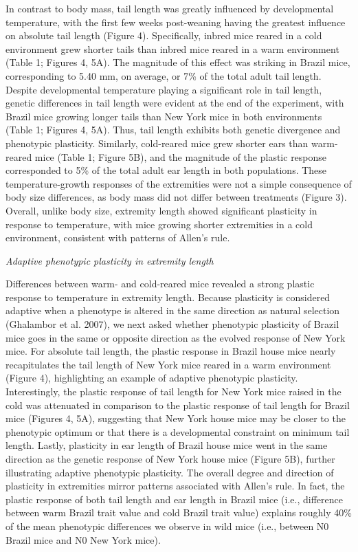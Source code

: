 \documentclass[
]{article}
\begin{document}
In contrast to body mass, tail length was greatly influenced by
developmental temperature, with the first few weeks post-weaning having
the greatest influence on absolute tail length (Figure 4). Specifically,
inbred mice reared in a cold environment grew shorter tails than inbred
mice reared in a warm environment (Table 1; Figures 4, 5A). The
magnitude of this effect was striking in Brazil mice, corresponding to
5.40 mm, on average, or 7\% of the total adult tail length. Despite
developmental temperature playing a significant role in tail length,
genetic differences in tail length were evident at the end of the
experiment, with Brazil mice growing longer tails than New York mice in
both environments (Table 1; Figures 4, 5A). Thus, tail length exhibits
both genetic divergence and phenotypic plasticity. Similarly,
cold-reared mice grew shorter ears than warm-reared mice (Table 1;
Figure 5B), and the magnitude of the plastic response corresponded to
5\% of the total adult ear length in both populations. These
temperature-growth responses of the extremities were not a simple
consequence of body size differences, as body mass did not differ
between treatments (Figure 3). Overall, unlike body size, extremity
length showed significant plasticity in response to temperature, with
mice growing shorter extremities in a cold environment, consistent with
patterns of Allen's rule.

\vspace{3.5mm}

\noindent\emph{Adaptive phenotypic plasticity in extremity length}

Differences between warm- and cold-reared mice revealed a strong plastic
response to temperature in extremity length. Because plasticity is
considered adaptive when a phenotype is altered in the same direction as
natural selection (Ghalambor et al. 2007), we next asked whether
phenotypic plasticity of Brazil mice goes in the same or opposite
direction as the evolved response of New York mice. For absolute tail
length, the plastic response in Brazil house mice nearly recapitulates
the tail length of New York mice reared in a warm environment (Figure
4), highlighting an example of adaptive phenotypic plasticity.
Interestingly, the plastic response of tail length for New York mice
raised in the cold was attenuated in comparison to the plastic response
of tail length for Brazil mice (Figures 4, 5A), suggesting that New York
house mice may be closer to the phenotypic optimum or that there is a
developmental constraint on minimum tail length. Lastly, plasticity in
ear length of Brazil house mice went in the same direction as the
genetic response of New York house mice (Figure 5B), further
illustrating adaptive phenotypic plasticity. The overall degree and
direction of plasticity in extremities mirror patterns associated with
Allen's rule. In fact, the plastic response of both tail length and ear
length in Brazil mice (i.e., difference between warm Brazil trait value
and cold Brazil trait value) explains roughly 40\% of the mean
phenotypic differences we observe in wild mice (i.e., between N0 Brazil
mice and N0 New York mice).
\end{document}
